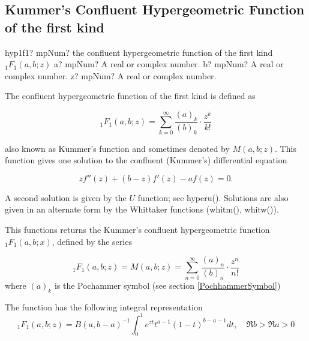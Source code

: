 \subsection{Kummer's Confluent Hypergeometric Function of the first kind}
\label{Hypergeometric1F1MpMath}


\begin{mpFunctionsExtract}
	\mpFunctionThree
	{hyp1f1? mpNum? the confluent hypergeometric function of the first kind ${}_1F_1(a,b;z)$}
	{a? mpNum? A real or complex number.}
	{b? mpNum? A real or complex number.}	
	{z? mpNum? A real or complex number.}		
\end{mpFunctionsExtract}

\vpara
The confluent hypergeometric function of the first kind is defined as

\begin{equation}
 {}_1F_1(a,b;z) = \sum_{k=0}^\infty\frac{(a)_k}{(b)_k}\cdot\frac{z^k}{k!}
\end{equation}

also known as Kummer's function and sometimes denoted by $M(a,b;z)$. This function gives one solution to the confluent (Kummer's) differential equation

\begin{equation}
z f''(z) + (b-z) f'(z) -a f(z)=0.
\end{equation}

A second solution is given by the $U$ function; see hyperu(). Solutions are also given in an alternate form by the Whittaker functions (whitm(), whitw()).


\vspace{0.3cm}
This functions returns the Kummer's confluent hypergeometric function ${}_1F_1(a, b; x)$, defined by the series 

\begin{equation}
{}_1F_1(a,b;z) = M(a,b;z) = \sum_{n=0}^\infty\frac{(a)_n}{(b)_n}\cdot\frac{z^n}{n!}
\end{equation}
where $(a)_k$ is the Pochammer symbol (see section \ref{PochhammerSymbol})

The function has the following integral representation
\begin{equation}
{}_1{F}_1(a,b;z)  = B(a,b-a)^{-1} \int_0^1{e^{zt}  t^{a-1}(1-t)^{b-a-1}}dt, \quad \Re b > \Re a > 0
\end{equation}

